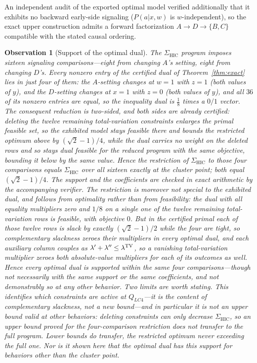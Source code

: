 \documentclass[10pt,twocolumn]{article}
\newtheorem{observation}{Observation}
\newcommand{\Sig}{\Sigma_{\mathrm{HIC}}}
\begin{document}
An independent audit of the exported optimal model verified additionally that it exhibits no backward early-side signaling ($P(a|x,w)$ is $w$-independent), so the exact upper construction admits a forward factorization $A \to D \to \{B,C\}$ compatible with the stated causal ordering.

\begin{observation}[Support of the optimal dual]
\label{obs:dualsupport}
The $\Sig$ program imposes sixteen signaling comparisons---eight from changing $A$'s setting, eight from changing $D$'s. Every nonzero entry of the certified dual of Theorem~\ref{thm:exact} lies in just four of them: the $A$-setting changes at $w=1$ with $z=1$ (both values of $y$), and the $D$-setting changes at $x=1$ with $z=0$ (both values of $y$), and all $36$ of its nonzero entries are equal, so the inequality dual is $\tfrac18$ times a $0/1$ vector. The consequent reduction is two-sided, and both sides are already certified: deleting the twelve remaining total-variation constraints \emph{enlarges} the primal feasible set, so the exhibited model stays feasible there and bounds the restricted optimum above by $(\sqrt2-1)/4$, while the dual carries no weight on the deleted rows and so stays dual feasible for the reduced program with the same objective, bounding it below by the same value. Hence the restriction of $\Sig$ to those four comparisons equals $\Sig$ over all sixteen \emph{exactly} at the cluster point; both equal $(\sqrt2-1)/4$. The support and the coefficients are checked in exact arithmetic by the accompanying verifier. The restriction is moreover not special to the exhibited dual, and follows from optimality rather than from feasibility: the dual with all equality multipliers zero and $1/8$ on a single one of the twelve remaining total-variation rows is feasible, with objective $0$. But in the certified primal each of those twelve rows is slack by exactly $(\sqrt2-1)/2$ while the four are tight, so complementary slackness zeroes their multipliers in \emph{every} optimal dual, and each auxiliary column couples as $\lambda'+\lambda''\le\lambda^{\rm TV}$, so a vanishing total-variation multiplier zeroes both absolute-value multipliers for each of its outcomes as well. Hence every optimal dual is supported within the same four comparisons---though not necessarily with the same support or the same coefficients, and not demonstrably so at any other behavior. Two limits are worth stating. This identifies which constraints are active at $Q_{LC4}$---it is the content of complementary slackness, not a new bound---and in particular it is not an upper bound valid at other behaviors: deleting constraints can only decrease $\Sig$, so an \emph{upper} bound proved for the four-comparison restriction does not transfer to the full program. Lower bounds do transfer, the restricted optimum never exceeding the full one. Nor is it shown here that the optimal dual has this support for behaviors other than the cluster point.
\end{observation}
\end{document}
